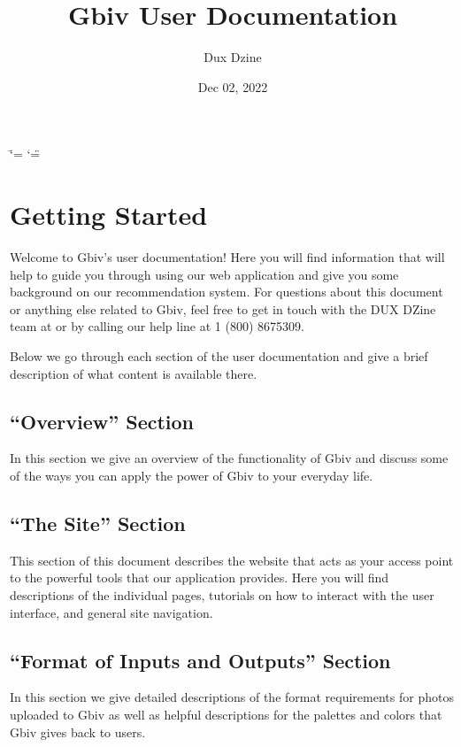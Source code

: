 \documentclass[letterpaper,10pt,english,openany,oneside]{sphinxmanual}
\title{Gbiv User Documentation}
\date{Dec 02, 2022}
\author{Dux D\sphinxhyphen{}zine}
\begin{document}
\ifdefined\shorthandoff
  \ifnum\catcode`\=\string=\active\shorthandoff{=}\fi
  \ifnum\catcode`\"=\active{}\fi
\fi

\pagestyle{empty}
\sphinxmaketitle
\pagestyle{plain}
\sphinxtableofcontents
\pagestyle{normal}
\label{\detokenize{index::doc}}


\sphinxstepscope


\chapter{Getting Started}
\label{\detokenize{getting_started:getting-started}}\label{\detokenize{getting_started:id1}}\label{\detokenize{getting_started::doc}}
\sphinxAtStartPar
Welcome to Gbiv’s user documentation! Here you will find information that will help to guide you through using our web application and give you some background on our recommendation system. For questions about this document or anything else related to Gbiv, feel free to get in touch with the DUX D\sphinxhyphen{}Zine team at  or by calling our help line at 1 (800) 867\sphinxhyphen{}5309.

\sphinxAtStartPar
Below we go through each section of the user documentation and give a brief description of what content is available there.


\section{“Overview” Section}
\label{\detokenize{getting_started:overview-section}}
\sphinxAtStartPar
In this section we give an overview of the functionality of Gbiv and discuss some of the ways you can apply the power of Gbiv to your everyday life.


\section{“The Site” Section}
\label{\detokenize{getting_started:the-site-section}}
\sphinxAtStartPar
This section of this document describes the website that acts as your access point to the powerful tools that our application provides. Here you will find descriptions of the individual pages, tutorials on how to interact with the user interface, and general site navigation.


\section{“Format of Inputs and Outputs” Section}
\label{\detokenize{getting_started:format-of-inputs-and-outputs-section}}
\sphinxAtStartPar
In this section we give detailed descriptions of the format requirements for photos uploaded to Gbiv as well as helpful descriptions for the palettes and colors that Gbiv gives back to users.
\end{document}
